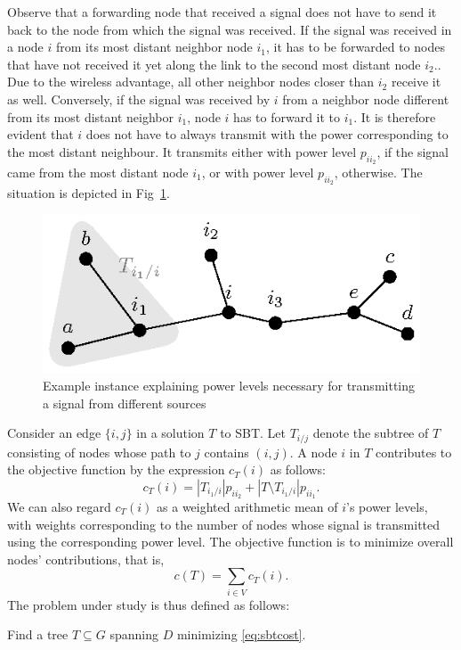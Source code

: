 Observe that a forwarding node that received a signal does not have to send it back to the node from which the signal was received.
If the signal was received in a node $i$ from its most distant neighbor node $i_1$, it has to be forwarded to nodes that have not received it yet along the link to the second most distant node $i_2$..
Due to the wireless advantage, all other neighbor nodes closer than $i_2$ receive it as well.
Conversely, if the signal was received by $i$ from a neighbor node different from its most distant neighbor $i_1$, node $i$ has to forward it to $i_1$. 
It is therefore evident that $i$ does not have to always transmit with the power corresponding to the most distant neighbour.
It transmits either with power level $p_{ii_2}$, if the signal came from the most distant node $i_1$, or with power level $p_{ii_2}$, otherwise.
The situation is depicted in Fig~\ref{fig:objexp}.
\begin{figure}[htb!]
  \centering
  \includegraphics[scale=1.4]{figurer/objexp.eps}
  \caption{Example instance explaining power levels necessary for transmitting a signal from different sources}
  \label{fig:objexp}
\end{figure}


Consider an edge $\{i,j\}$ in a solution $T$ to SBT.
Let $T_{i/j}$ denote the subtree of $T$ consisting of nodes whose path to $j$ contains $(i,j)$. 
A node $i$ in $T$ contributes to the objective function by the expression $c_T(i)$ as follows:
\begin{equation}
c_T(i)=|T_{i_1/i}|p_{ii_2} + |T\setminus T_{i_1/i}|p_{ii_1}.
\end{equation}
We can also regard $c_T(i)$ as a weighted arithmetic mean of $i$'s power levels, with weights corresponding to the number of nodes whose signal is transmitted using the corresponding power level.
The objective function is to minimize overall nodes' contributions, that is,
\begin{equation}
c(T)=\sum\limits_{i\in V}c_T(i).
\label{eq:sbtcost}
\end{equation}
The problem under study is thus defined as follows:
\begin{problem}
Find a tree $T\subseteq G$ spanning $D$ minimizing \eqref{eq:sbtcost}.
\end{problem}

